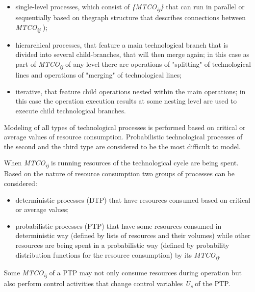 \documentclass{article}
\begin{document}
\begin{minipage}[t]{0.45\textwidth}

\begin{itemize}[noitemsep,topsep=2pt]
\item single-level processes, which consist of \textit{\{MTCO\textsubscript{ij}\}} that can run in parallel or sequentially based on thegraph structure that describes connections between \textit{MTCO\textsubscript{ij}} );
\item hierarchical processes, that feature a main technological branch that is divided into several child-branches, that will then merge again; in this case as part of \textit{MTCO\textsubscript{ij}} of any level there are operations of "splitting" of technological lines and operations of "merging" of technological lines;
\item iterative, that feature child operations nested within the main operations; in this case the operation execution results at some nesting level are used to execute child technological branches.
\end{itemize}
    \vspace{0.2\baselineskip} \hspace{0.2cm} Modeling of all types of technological processes is performed based on critical or average values of resource consumption. Probabilistic technological processes of the second and the third type are considered to be the most difficult to model.

    \hspace{0.2cm} When \textit{MTCO\textsubscript{ij}} is running resources of the technological cycle are being spent. Based on the nature of resource consumption two groups of processes can be considered:
\begin{itemize}[noitemsep,topsep=2pt]
  \item \vspace{0.3\baselineskip} deterministic processes (DTP) that have resources consumed based on critical or average values;
  \item probabilistic processes (PTP) that have some resources consumed in deterministic way (defined by lists of resources and their volumes) while other resources are being spent in a probabilistic way (defined by probability distribution functions for the resource consumption) by its \textit{MTCO\textsubscript{ij}}.
\end{itemize}
    \vspace{0.3\baselineskip} \hspace{0.2cm} Some \textit{MTCO\textsubscript{ij}} of a PTP may not only consume resources during operation but also perform control activities that change control variables \textit{U\textsubscript{s}} of the PTP. 
    

\end{minipage}
\end{document}

